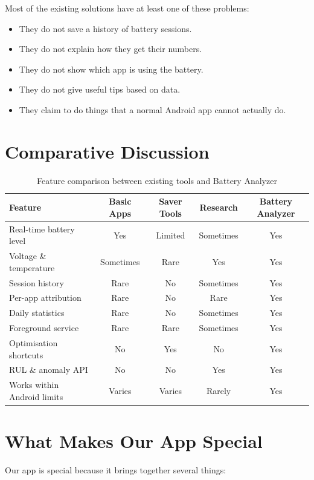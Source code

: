 \documentclass[12pt,a4paper]{report}
\begin{document}
Most of the existing solutions have at least one of these problems:

\begin{itemize}
    \item They do not save a history of battery sessions.
    \item They do not explain how they get their numbers.
    \item They do not show which app is using the battery.
    \item They do not give useful tips based on data.
    \item They claim to do things that a normal Android app cannot actually do.
\end{itemize}

\section{Comparative Discussion}

\begin{table}[H]
\caption{Feature comparison between existing tools and Battery Analyzer}
\centering
\small
\begin{tabular}{lcccc}
\toprule
\textbf{Feature} & \textbf{Basic Apps} & \textbf{Saver Tools}
                 & \textbf{Research} & \textbf{Battery Analyzer}\\
\midrule
Real-time battery level     & Yes  & Limited & Sometimes & Yes\\
Voltage \& temperature      & Sometimes & Rare  & Yes  & Yes\\
Session history             & Rare & No    & Sometimes & Yes\\
Per-app attribution         & Rare & No    & Rare  & Yes\\
Daily statistics            & Rare & No    & Sometimes & Yes\\
Foreground service          & Rare & Rare  & Sometimes & Yes\\
Optimisation shortcuts      & No   & Yes   & No    & Yes\\
RUL \& anomaly API          & No   & No    & Yes   & Yes\\
Works within Android limits & Varies & Varies & Rarely & Yes\\
\bottomrule
\end{tabular}
\end{table}

\section{What Makes Our App Special}
Our app is special because it brings together several things:
\end{document}

